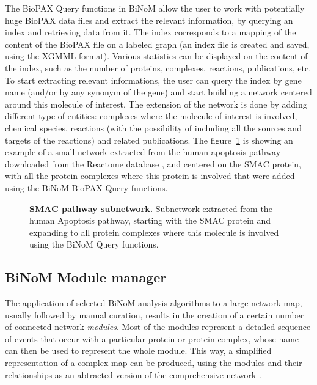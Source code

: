 \documentclass[10pt]{bmc_article}
\newenvironment{bmcformat}{\baselineskip20pt\sloppy\setboolean{publ}{false}}{\baselineskip20pt\sloppy}
\begin{document}
\begin{bmcformat}
The BioPAX Query functions in BiNoM allow the user to work with potentially huge
BioPAX data files and extract the relevant information, by querying an index and
retrieving data from it. The index corresponds to a mapping of the content of
the BioPAX file on a labeled graph (an index file is created and saved, using
the XGMML format). Various statistics can be displayed on the content of the
index, such as the number of proteins, complexes, reactions, publications, etc.
To start extracting relevant informations, the user can query the index by gene
name (and/or by any synonym of the gene) and start building a network centered
around this molecule of interest. The extension of the network is done by adding
different type of entities: complexes where the molecule of interest is
involved, chemical species, reactions (with the possibility of including all the
sources and targets of the reactions) and related publications. The figure~\ref{smaccomplexes}
is showing an example of a small network extracted from the human apoptosis
pathway downloaded from the Reactome database \cite{joshi2005reactome}, and
centered on the SMAC protein, with all the protein complexes where
this protein is involved that were added using the BiNoM BioPAX Query functions.


\begin{figure}[h]
 \caption{\label{smaccomplexes}  \textbf{SMAC pathway subnetwork.}
      Subnetwork extracted from the human Apoptosis pathway, starting with the
SMAC protein and expanding to all protein complexes where this
molecule is involved using the BiNoM Query functions.}
\end{figure}


\subsection*{BiNoM Module manager}
The application of selected BiNoM analysis algorithms to a large network map,
usually followed by manual curation, results in the creation of a certain number
of connected network \emph{modules}. Most of the modules represent a detailed
sequence of events that occur with a particular protein or protein complex,
whose name can then be used to represent the whole module. This way, a
simplified representation of a complex map can be produced, using the modules
and their relationships as an abtracted version of the comprehensive network
\cite{calzone2008comprehensive}.


\end{bmcformat}
\end{document}
